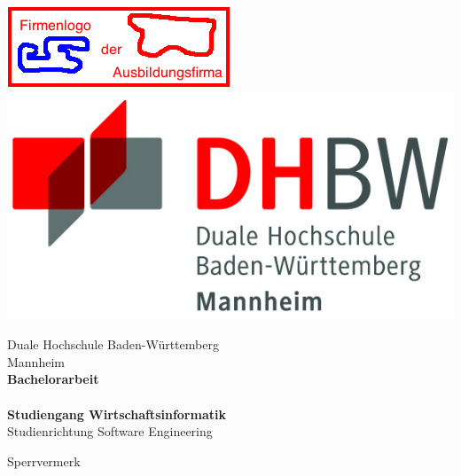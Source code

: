 \begin{titlepage}
\begin{minipage}{\textwidth}
		\vspace{-2cm}
		\noindent \includegraphics[scale=0.71]{img/firmenlogo.jpg} \hfill   \includegraphics{img/logo.jpg}
\end{minipage}
\vspace{1em}
\sffamily
\begin{center}
	\textsf{\large{}Duale Hochschule Baden-W\"urttemberg\\[1.5mm] Mannheim}\\[2em]
	\textsf{\textbf{\Large{}Bachelorarbeit}}\\[3mm]
	\textsf{\textbf{\DerTitelDerArbeit}} \\[1.5cm]
	\textsf{\textbf{\Large{}Studiengang Wirtschaftsinformatik}\\[3mm] \textsf{Studienrichtung Software Engineering}}
	
	\vspace{3em}
	\textsf{\Large{Sperrvermerk}}
\vfill

\begin{minipage}{\textwidth}


\end{minipage}
\end{center}
\end{titlepage}
